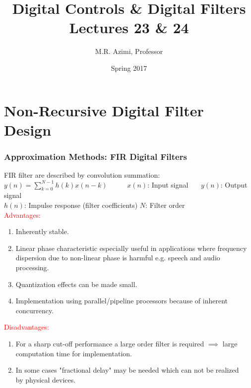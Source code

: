 \documentclass[mathserif, 10pt]{beamer} %
\title[Digital Control \& Digital Filters]{Digital Controls \& Digital Filters \\ Lectures 23 \& 24}
\author[M.R. Azimi]{M.R. Azimi, Professor}
\institute[CSU-ECE]{Department of Electrical and Computer Engineering \\ Colorado State University}
\date{Spring 2017}
\begin{document}

\frame{\titlepage}




\section{Non-Recursive Digital Filter Design}
\frame
{
\small
\frametitle{Approximation Methods: FIR Digital Filters}

FIR filter are described by convolution summation:\\
$y(n) = \sum\limits_{k=0}^{N-1} h(k) x(n-k)$~~~~~
$x(n)$:  Input signal~~~
$y(n)$:  Output signal~\\
$h(n)$:  Impulse response (filter coefficients) \hspace{0.2in} $N$:  Filter order \\

\textcolor{red}{Advantages:}\\
\begin{enumerate}
	\item Inherently stable.
	\item Linear phase characteristic especially useful in applications where frequency dispersion due to non-linear phase is harmful e.g. speech and audio processing.
	\item Quantization effects can be made small.
	\item Implementation using parallel/pipeline processors because of inherent concurrency.
\end{enumerate}

\textcolor{red}{Disadvantages:}\\
\begin{enumerate}
	\item For a sharp cut-off performance a large order filter is required $\implies$ large computation time for implementation.
	\item In some cases "fractional delay" may be needed which can not be realized \\by physical devices.
\end{enumerate}

}
\end{document}
